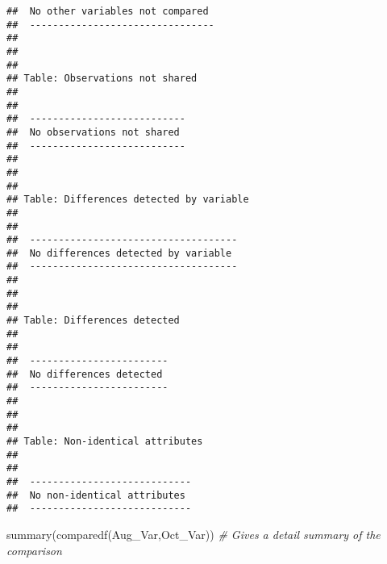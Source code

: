 \documentclass[
]{article}
\newenvironment{Shaded}{\begin{snugshade}}{\end{snugshade}}
\newcommand{\CommentTok}[1]{\textcolor[rgb]{0.56,0.35,0.01}{\textit{#1}}}
\newcommand{\FunctionTok}[1]{\textcolor[rgb]{0.00,0.00,0.00}{#1}}
\newcommand{\NormalTok}[1]{#1}
\begin{document}
\begin{verbatim}
##  No other variables not compared 
##  --------------------------------
## 
## 
## 
## Table: Observations not shared
## 
##                             
##  ---------------------------
##  No observations not shared 
##  ---------------------------
## 
## 
## 
## Table: Differences detected by variable
## 
##                                      
##  ------------------------------------
##  No differences detected by variable 
##  ------------------------------------
## 
## 
## 
## Table: Differences detected
## 
##                          
##  ------------------------
##  No differences detected 
##  ------------------------
## 
## 
## 
## Table: Non-identical attributes
## 
##                              
##  ----------------------------
##  No non-identical attributes 
##  ----------------------------
\end{verbatim}

\begin{Shaded}
\begin{Highlighting}[]
 \FunctionTok{summary}\NormalTok{(}\FunctionTok{comparedf}\NormalTok{(Aug\_Var,Oct\_Var)) }\CommentTok{\# Gives a detail summary of the comparison}
\end{Highlighting}
\end{Shaded}
\end{document}
